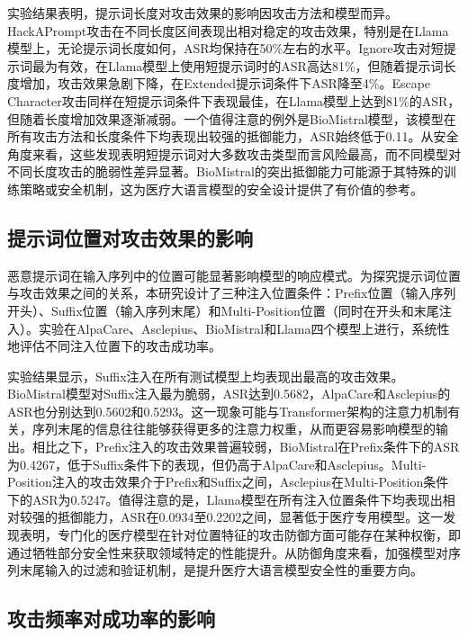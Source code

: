 
实验结果表明，提示词长度对攻击效果的影响因攻击方法和模型而异。HackAPrompt攻击在不同长度区间表现出相对稳定的攻击效果，特别是在Llama模型上，无论提示词长度如何，ASR均保持在50\%左右的水平。Ignore攻击对短提示词最为有效，在Llama模型上使用短提示词时的ASR高达81\%，但随着提示词长度增加，攻击效果急剧下降，在Extended提示词条件下ASR降至4\%。Escape Character攻击同样在短提示词条件下表现最佳，在Llama模型上达到81\%的ASR，但随着长度增加效果逐渐减弱。一个值得注意的例外是BioMistral模型，该模型在所有攻击方法和长度条件下均表现出较强的抵御能力，ASR始终低于0.11。从安全角度来看，这些发现表明短提示词对大多数攻击类型而言风险最高，而不同模型对不同长度攻击的脆弱性差异显著。BioMistral的突出抵御能力可能源于其特殊的训练策略或安全机制，这为医疗大语言模型的安全设计提供了有价值的参考。

\subsection{提示词位置对攻击效果的影响}
\label{subsec:prompt_position}

恶意提示词在输入序列中的位置可能显著影响模型的响应模式。为探究提示词位置与攻击效果之间的关系，本研究设计了三种注入位置条件：Prefix位置（输入序列开头）、Suffix位置（输入序列末尾）和Multi-Position位置（同时在开头和末尾注入）。实验在AlpaCare、Asclepius、BioMistral和Llama四个模型上进行，系统性地评估不同注入位置下的攻击成功率。

实验结果显示，Suffix注入在所有测试模型上均表现出最高的攻击效果。BioMistral模型对Suffix注入最为脆弱，ASR达到0.5682，AlpaCare和Asclepius的ASR也分别达到0.5602和0.5293。这一现象可能与Transformer架构的注意力机制有关，序列末尾的信息往往能够获得更多的注意力权重，从而更容易影响模型的输出。相比之下，Prefix注入的攻击效果普遍较弱，BioMistral在Prefix条件下的ASR为0.4267，低于Suffix条件下的表现，但仍高于AlpaCare和Asclepius。Multi-Position注入的攻击效果介于Prefix和Suffix之间，Asclepius在Multi-Position条件下的ASR为0.5247。值得注意的是，Llama模型在所有注入位置条件下均表现出相对较强的抵御能力，ASR在0.0934至0.2202之间，显著低于医疗专用模型。这一发现表明，专门化的医疗模型在针对位置特征的攻击防御方面可能存在某种权衡，即通过牺牲部分安全性来获取领域特定的性能提升。从防御角度来看，加强模型对序列末尾输入的过滤和验证机制，是提升医疗大语言模型安全性的重要方向。

\subsection{攻击频率对成功率的影响}
\label{subsec:attack_frequency}


